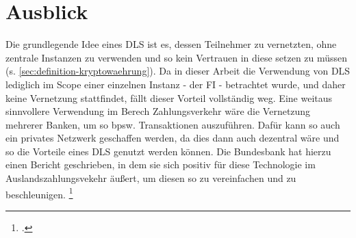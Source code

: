 \noindent

\section{Ausblick}
\label{sec:ausblick}

Die grundlegende Idee eines DLS ist es, dessen Teilnehmer zu vernetzten, ohne zentrale Instanzen zu verwenden und so kein Vertrauen in diese setzen zu müssen (s. \ref{sec:definition-kryptowaehrung}).
Da in dieser Arbeit die Verwendung von DLS lediglich im Scope einer einzelnen Instanz - der FI - betrachtet wurde, und daher keine Vernetzung stattfindet, fällt dieser Vorteil vollständig weg.
Eine weitaus sinnvollere Verwendung im Berech Zahlungsverkehr wäre die Vernetzung mehrerer Banken, um so bpsw. Transaktionen auszuführen.
Dafür kann so auch ein privates Netzwerk geschaffen werden, da dies dann auch dezentral wäre und so die Vorteile eines DLS genutzt werden können.
Die Bundesbank hat hierzu einen Bericht geschrieben, in dem sie sich positiv für diese Technologie im Auslandszahlungsvekehr äußert, um diesen so zu vereinfachen und zu beschleunigen. \footcite[Vgl.][44]{q12}